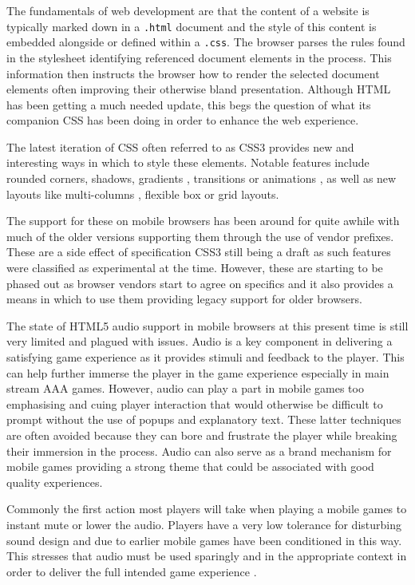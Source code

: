 \documentclass[final]{cmpreport}
\begin{document}
The fundamentals of web development are that the content of a website is typically marked down in a \texttt{.html} document and the style of this content is embedded alongside or defined within a \texttt{.css}. The browser parses the rules found in the stylesheet identifying referenced document elements in the process. This information then instructs the browser how to render the selected document elements often improving their otherwise bland presentation. Although HTML has been getting a much needed update, this begs the question of what its companion CSS has been doing in order to enhance the web experience. 

The latest iteration of CSS often referred to as CSS3 provides new and interesting ways in which to style these elements. Notable features include rounded corners, shadows, gradients , transitions or animations , as well as new layouts like multi-columns , flexible box or grid layouts\footnotemark.


The support for these on mobile browsers has been around for quite awhile with much of the older versions supporting them through the use of vendor prefixes. These are a side effect of specification CSS3 still being a draft as such features were classified as experimental at the time. However, these are starting to be phased out as browser vendors start to agree on specifics and it also provides a means in which to use them providing legacy support for older browsers.



The state of HTML5 audio support in mobile browsers at this present time is still very limited and plagued with issues. Audio is a key component in delivering a satisfying game experience as it provides stimuli and feedback to the player. This can help further immerse the player in the game experience especially in main stream AAA games. However, audio can play a part in mobile games too emphasising and cuing player interaction that would otherwise be difficult to prompt without the use of popups and explanatory text. These latter techniques are often avoided because they can bore and frustrate the player while breaking their immersion in the process. Audio can also serve as a brand mechanism for mobile games providing a strong theme that could be associated with good quality experiences.

Commonly the first action most players will take when playing a mobile games to instant mute or lower the audio. Players have a very low tolerance for disturbing sound design and due to earlier mobile games have been conditioned in this way. This stresses that audio must be used sparingly and in the appropriate context in order to deliver the full intended game experience \cite{Thomas}.
\end{document}
